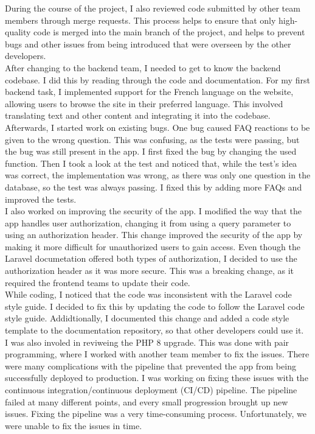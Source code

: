 \documentclass[sf-font,usefira,english]{uulm/sp/article}
\begin{document}
During the course of the project, I also reviewed code 
submitted by other team members through merge requests. 
This process helps to ensure that only high-quality code 
is merged into the main branch of the project, 
and helps to prevent bugs and other issues from being introduced 
that were overseen by the other developers.\\

After changing to the backend team, I needed to get to 
know the backend codebase.
I did this by reading through the code and documentation.
For my first backend task, I implemented support for the French language on the website, 
allowing users to browse the site in their preferred language. 
This involved translating text and other content and 
integrating it into the codebase.\\

Afterwards, I started work on existing bugs.
One bug caused FAQ reactions to be given to the wrong question.
This was confusing, as the tests were passing,
but the bug was still present in the app.
I first fixed the bug by changing the used function.
Then I took a look at the test and noticed that,
while the test's idea was correct, the implementation was wrong,
as there was only one question in the database,
so the test was always passing.
I fixed this by adding more FAQs and improved the tests.\\

I also worked on improving the security of the app.
I modified the way that the app handles user authorization, 
changing it from using a query parameter to using an authorization header. 
This change improved the security of the app by making 
it more difficult for unauthorized users to gain access.
Even though the Laravel documetation offered both types of authorization,
I decided to use the authorization header as it was more secure.
This was a breaking change, as it required the frontend teams to update their code.\\

While coding, I noticed that the code was inconsistent
with the Laravel code style guide.
I decided to fix this by updating the code to follow the Laravel code style guide.
Addidtionally, I documented this change and added a code style template
to the documentation repository, so that other developers could use it.\\

I was also involed in reviweing the PHP 8 upgrade.
This was done with pair programming, 
where I worked with another team member to fix the issues.
There were many complications with the pipeline 
that prevented the app from being successfully deployed to production.
I was working on fixing these issues with the continuous 
integration/continuous deployment (CI/CD) pipeline.
The pipeline failed at many different points,
and every small progression brought up new issues.
Fixing the pipeline was a very time-consuming process.
Unfortunately, we were unable to fix the issues in time.\\
\end{document}
